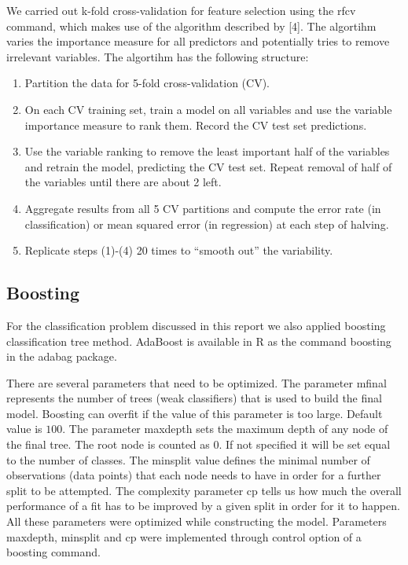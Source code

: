 \documentclass{article}
\begin{document}
We carried out k-fold cross-validation for feature selection using the {\selectfont rfcv} command, which makes use of the algorithm described by [4].  The algortihm varies the importance measure for all predictors and potentially tries to remove irrelevant variables. The algortihm has the following structure:
\begin{enumerate}
\item Partition the data for 5-fold cross-validation (CV).
\item On each CV training set, train a model on all variables and use the variable
importance measure to rank them. Record the CV test set predictions.
\item Use the variable ranking to remove the least important half of the variables
and retrain the model, predicting the CV test set. Repeat removal of half of
the variables until there are about 2 left.
\item Aggregate results from all 5 CV partitions and compute the error rate (in
classification) or mean squared error (in regression) at each step of halving.
\item Replicate steps (1)-(4) 20 times to “smooth out” the variability.
\end{enumerate}

\subsection{Boosting}

For the classification problem discussed in this report we also applied boosting classification tree method. AdaBoost is available in R as the command {\selectfont boosting} in the {\selectfont adabag} package.

There are several parameters that need to be optimized. The parameter {\selectfont mfinal} represents the number of trees (weak classifiers) that is used to build the final model. Boosting can overfit if the value of this parameter is too large. Default value is $100$. The parameter {\selectfont maxdepth} sets the maximum depth of any node of the final tree. The root node is counted as $0$. If not specified it will be set equal to the number of classes. The {\selectfont minsplit} value defines the minimal number of observations (data points) that each node needs to have in order for a further split to be attempted. The complexity parameter {\selectfont cp} tells us how much the overall performance of a fit has to be improved by a given split in order for it to happen. All these parameters were optimized while constructing the model. Parameters {\selectfont maxdepth}, {\selectfont minsplit} and {\selectfont cp} were implemented through {\selectfont control} option of a {\selectfont boosting} command.
\end{document}
